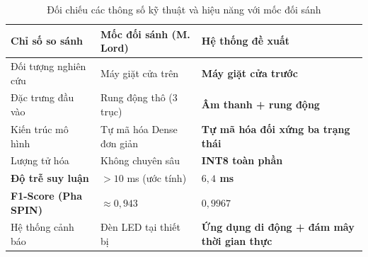 \begin{table}[H]
    \centering
    \caption[Đối chiếu hiệu năng với mốc đối sánh]{Đối chiếu các thông số kỹ thuật và hiệu năng với mốc đối sánh \cite{ref_1_lord}}
    \label{tab:comparison_baseline}
    \renewcommand{\arraystretch}{1.25}
    \begin{tabularx}{\textwidth}{|>{\raggedright\arraybackslash}p{}|>{\raggedright\arraybackslash}X|>{\raggedright\arraybackslash}X|}
    \hline
    \rowcolor[HTML]{EFEFEF}
    \textbf{Chỉ số so sánh} & \textbf{Mốc đối sánh (M. Lord)} & \textbf{Hệ thống đề xuất} \\ \hline
    Đối tượng nghiên cứu & Máy giặt cửa trên & \textbf{Máy giặt cửa trước} \\ \hline
    Đặc trưng đầu vào & Rung động thô (3 trục) & \textbf{Âm thanh + rung động} \\ \hline
    Kiến trúc mô hình & Tự mã hóa Dense đơn giản & \textbf{Tự mã hóa đối xứng ba trạng thái} \\ \hline
    Lượng tử hóa & Không chuyên sâu & \textbf{INT8 toàn phần} \\ \hline
    \textbf{Độ trễ suy luận} & $> 10$ ms (ước tính) & \textbf{$6{,}4$ ms} \\ \hline
    \textbf{F1-Score (Pha SPIN)} & $\approx 0{,}943$ & \textbf{$0{,}9967$} \\ \hline
    Hệ thống cảnh báo & Đèn LED tại thiết bị & \textbf{Ứng dụng di động + đám mây thời gian thực} \\ \hline
    \end{tabularx}
\end{table}
